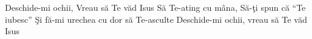 
\beginverse
Deschide-mi ochii, Vreau să Te văd Isus
Să Te-ating cu mâna, Să-ţi spun că “Te iubesc”
Şi fă-mi urechea cu dor să Te-asculte
Deschide-mi ochii, vreau să Te văd Isus
\endverse

\endsong

